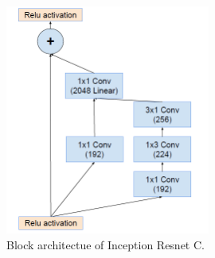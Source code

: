 \documentclass[a4paper,12pt,oneside]{book}
\begin{document}
\begin{figure}[!hbtp]
\centering
\includegraphics[width=0.6\textwidth]{Figures/inception_resnet_C.png}
\captionsetup{font=small}
\caption{Block architectue of Inception Resnet C.}
\label{fig:resnet}
\end{figure}
\end{document}
